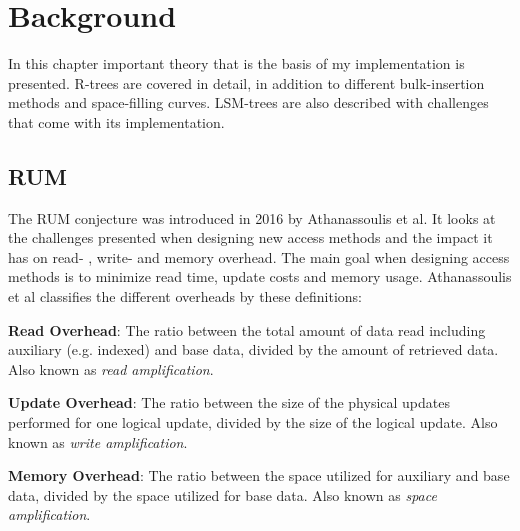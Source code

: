 \chapter{Background}
\label{chap:background}

In this chapter important theory that is the basis of my implementation is presented. R-trees are covered in detail, in addition to different bulk-insertion methods and space-filling curves. LSM-trees are also described with challenges that come with its implementation. 

\section{RUM}
The RUM conjecture was introduced in 2016 by Athanassoulis et al\cite{RUM}. It looks at the challenges presented when designing new access methods and the impact it has on read- , write- and memory overhead. The main goal when designing access methods is to minimize read time, update costs and memory usage. Athanassoulis et al classifies the different overheads by these definitions: \newline

\noindent
\textbf{Read Overhead}: The ratio between the total amount of data read including auxiliary (e.g. indexed) and base data, divided by the amount of retrieved data. Also known as \emph{read amplification}.\newline

\noindent
\textbf{Update Overhead}: The ratio between the size of the physical updates performed for one logical update, divided by the size of the logical update. Also known as \emph{write amplification}.\newline

\noindent
\textbf{Memory Overhead}: The ratio between the space utilized for auxiliary and base data, divided by the space utilized for base data. Also known as \emph{space amplification}. \newline

